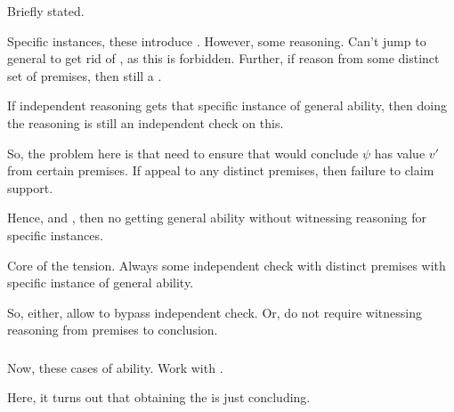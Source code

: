 \begin{note}
  Briefly stated.

  Specific instances, these introduce \requ{}.
  However, some reasoning.
  Can't jump to general to get rid of \requ{}, as this is forbidden.
  Further, if reason from some distinct set of premises, then still a \requ{}.

  If independent reasoning gets that specific instance of general ability, then doing the reasoning is still an independent check on this.

  So, the problem here is that need to ensure that would conclude \(\psi\) has value \(v'\) from certain premises.
  If appeal to any distinct premises, then failure to claim support.

  Hence, \ESU{} and \ideaCS{}, then no getting general ability without witnessing reasoning for specific instances.

  Core of the tension.
  Always some independent check with distinct premises with specific instance of general ability.

  So, either, allow to bypass independent check.
  Or, do not require witnessing reasoning from premises to conclusion.
\end{note}

\subsubsection{\adB{}}
\label{sec:tension:adb}

\begin{note}
  Now, these cases of ability.
  Work with \adB{}.
\end{note}

\begin{note}
  Here, it turns out that obtaining the \itp{} is just concluding.
\end{note}

